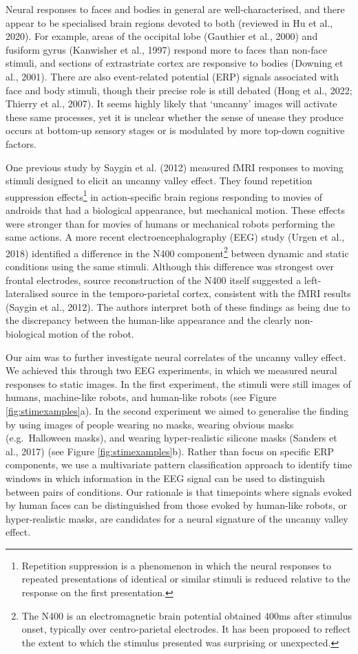 \documentclass[
]{article}
\begin{document}
Neural responses to faces and bodies in general are well-characterised, and there appear to be specialised brain regions devoted to both (reviewed in Hu et al., 2020). For example, areas of the occipital lobe (Gauthier et al., 2000) and fusiform gyrus (Kanwisher et al., 1997) respond more to faces than non-face stimuli, and sections of extrastriate cortex are responsive to bodies (Downing et al., 2001). There are also event-related potential (ERP) signals associated with face and body stimuli, though their precise role is still debated (Hong et al., 2022; Thierry et al., 2007). It seems highly likely that `uncanny' images will activate these same processes, yet it is unclear whether the sense of unease they produce occurs at bottom-up sensory stages or is modulated by more top-down cognitive factors.

One previous study by Saygin et al. (2012) measured fMRI responses to moving stimuli designed to elicit an uncanny valley effect. They found repetition suppression effects\footnote{Repetition suppression is a phenomenon in which the neural responses to repeated presentations of identical or similar stimuli is reduced relative to the response on the first presentation.} in action-specific brain regions responding to movies of androids that had a biological appearance, but mechanical motion. These effects were stronger than for movies of humans or mechanical robots performing the same actions. A more recent electroencephalography (EEG) study (Urgen et al., 2018) identified a difference in the N400 component\footnote{The N400 is an electromagnetic brain potential obtained 400ms after stimulus onset, typically over centro-parietal electrodes. It has been proposed to reflect the extent to which the stimulus presented was surprising or unexpected.} between dynamic and static conditions using the same stimuli. Although this difference was strongest over frontal electrodes, source reconstruction of the N400 itself suggested a left-lateralised source in the temporo-parietal cortex, consistent with the fMRI results (Saygin et al., 2012). The authors interpret both of these findings as being due to the discrepancy between the human-like appearance and the clearly non-biological motion of the robot.

Our aim was to further investigate neural correlates of the uncanny valley effect. We achieved this through two EEG experiments, in which we measured neural responses to static images. In the first experiment, the stimuli were still images of humans, machine-like robots, and human-like robots (see Figure \ref{fig:stimexamples}a). In the second experiment we aimed to generalise the finding by using images of people wearing no masks, wearing obvious masks (e.g.~Halloween masks), and wearing hyper-realistic silicone masks (Sanders et al., 2017) (see Figure \ref{fig:stimexamples}b). Rather than focus on specific ERP components, we use a multivariate pattern classification approach to identify time windows in which information in the EEG signal can be used to distinguish between pairs of conditions. Our rationale is that timepoints where signals evoked by human faces can be distinguished from those evoked by human-like robots, or hyper-realistic masks, are candidates for a neural signature of the uncanny valley effect.
\end{document}
